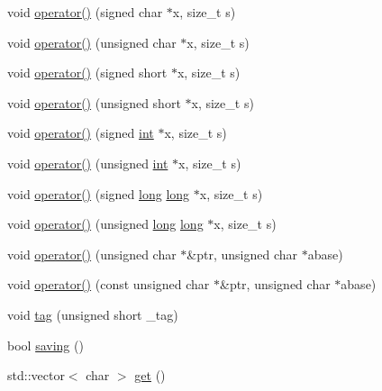 \begin{DoxyCompactItemize}
void \hyperlink{classgambatte_1_1loadsave__save_a55e184031d552364869557fa261dd8a3}{operator()} (signed char $\ast$x, size\+\_\+t s)
\item 
void \hyperlink{classgambatte_1_1loadsave__save_a3fd21e1304933c50846c1cea2fde800f}{operator()} (unsigned char $\ast$x, size\+\_\+t s)
\item 
void \hyperlink{classgambatte_1_1loadsave__save_a5c16d14663134c6a20d967889edab1b3}{operator()} (signed short $\ast$x, size\+\_\+t s)
\item 
void \hyperlink{classgambatte_1_1loadsave__save_a463457f83303ddf1584a318a6e068229}{operator()} (unsigned short $\ast$x, size\+\_\+t s)
\item 
void \hyperlink{classgambatte_1_1loadsave__save_a05d2bb63ce5489b66a040d8ece61765c}{operator()} (signed \hyperlink{ioapi_8h_a787fa3cf048117ba7123753c1e74fcd6}{int} $\ast$x, size\+\_\+t s)
\item 
void \hyperlink{classgambatte_1_1loadsave__save_a19333effc14f2a44a7ae56ee0a2536f4}{operator()} (unsigned \hyperlink{ioapi_8h_a787fa3cf048117ba7123753c1e74fcd6}{int} $\ast$x, size\+\_\+t s)
\item 
void \hyperlink{classgambatte_1_1loadsave__save_a728994d21679b1d7d5bbc916701c1125}{operator()} (signed \hyperlink{ioapi_8h_a3c7b35ad9dab18b8310343c201f7b27e}{long} \hyperlink{ioapi_8h_a3c7b35ad9dab18b8310343c201f7b27e}{long} $\ast$x, size\+\_\+t s)
\item 
void \hyperlink{classgambatte_1_1loadsave__save_a54522867610dbbbb57932a862914646b}{operator()} (unsigned \hyperlink{ioapi_8h_a3c7b35ad9dab18b8310343c201f7b27e}{long} \hyperlink{ioapi_8h_a3c7b35ad9dab18b8310343c201f7b27e}{long} $\ast$x, size\+\_\+t s)
\item 
void \hyperlink{classgambatte_1_1loadsave__save_a5b38424b1f911e556303de3521424b1e}{operator()} (unsigned char $\ast$\&ptr, unsigned char $\ast$abase)
\item 
void \hyperlink{classgambatte_1_1loadsave__save_ab01cad527821d3a04eea9fae06d1e4bf}{operator()} (const unsigned char $\ast$\&ptr, unsigned char $\ast$abase)
\item 
void \hyperlink{classgambatte_1_1loadsave__save_a38e0327b81d707e1037e3f3ad523ffab}{tag} (unsigned short \+\_\+tag)
\item 
bool \hyperlink{classgambatte_1_1loadsave__save_a61ddca93672c2924df92e9f5652dd849}{saving} ()
\item 
std\+::vector$<$ char $>$ \hyperlink{classgambatte_1_1loadsave__save_a367371f799d0733c2937b4e3cba1e9e8}{get} ()
\end{DoxyCompactItemize}
